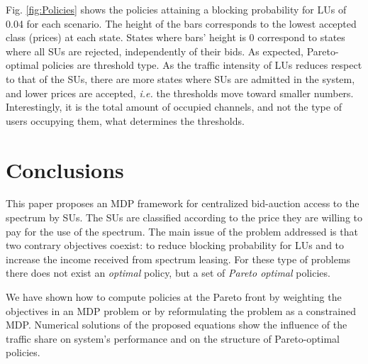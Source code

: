 Fig. \ref{fig:Policies} shows the policies attaining a blocking probability for LUs of 0.04 for each scenario.
The height of the bars corresponds to the lowest accepted class (prices) at each state. States where bars' height is $0$ correspond to states where all SUs are rejected, independently of their bids. As expected, Pareto-optimal policies are threshold type. As the traffic intensity of LUs reduces respect to that of the SUs, there are more states where SUs are admitted in the system, and lower prices are accepted, \textit{i.e.} the thresholds move toward smaller numbers. Interestingly, it is the total amount of occupied channels, and not the type of users occupying them, what determines the thresholds.


\section{Conclusions}\label{Sarnoff_sec_conclusions}
This paper proposes an MDP framework for centralized bid-auction access to the spectrum by SUs. The SUs are classified according to the price they are willing to pay for the use of the spectrum. The main issue of the problem addressed is that two contrary objectives coexist: to reduce blocking probability for LUs and to increase the income received from spectrum leasing. For these type of problems there does not exist an \textit{optimal} policy, but a set of \textit{Pareto optimal} policies. 

We have shown how to compute policies at the Pareto front by weighting the objectives in an MDP problem or by reformulating the problem as a constrained MDP. 
Numerical solutions of the proposed equations show the influence of the traffic share on system's performance and on the structure of Pareto-optimal policies. 



